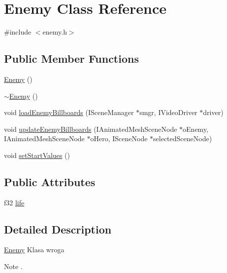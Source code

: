 \hypertarget{class_enemy}{
\section{Enemy Class Reference}
\label{class_enemy}
}


{\ttfamily \#include $<$enemy.h$>$}\subsection*{Public Member Functions}
\begin{DoxyCompactItemize}
\item 
\hyperlink{class_enemy_a94f30d348b6d2840fd71675472ba38dd}{Enemy} ()
\item 
\hyperlink{class_enemy_ac0eec4755e28c02688065f9657150ac3}{$\sim$Enemy} ()
\item 
void \hyperlink{class_enemy_a0ab9508df2fd67274909f58eb45bfe1d}{loadEnemyBillboards} (ISceneManager $\ast$smgr, IVideoDriver $\ast$driver)
\item 
void \hyperlink{class_enemy_ad8e2fa7bfcea903de98517326f5c6517}{updateEnemyBillboards} (IAnimatedMeshSceneNode $\ast$oEnemy, IAnimatedMeshSceneNode $\ast$oHero, ISceneNode $\ast$selectedSceneNode)
\item 
void \hyperlink{class_enemy_aadb12aa34b916fa9545f00c2000cbb89}{setStartValues} ()
\end{DoxyCompactItemize}
\subsection*{Public Attributes}
\begin{DoxyCompactItemize}
\item 
f32 \hyperlink{class_enemy_ace10e5f8707eadb16af82ea13f49de13}{life}
\end{DoxyCompactItemize}


\subsection{Detailed Description}
\hyperlink{class_enemy}{Enemy} Klasa wroga \begin{DoxyNote}{Note}
. 
\end{DoxyNote}


